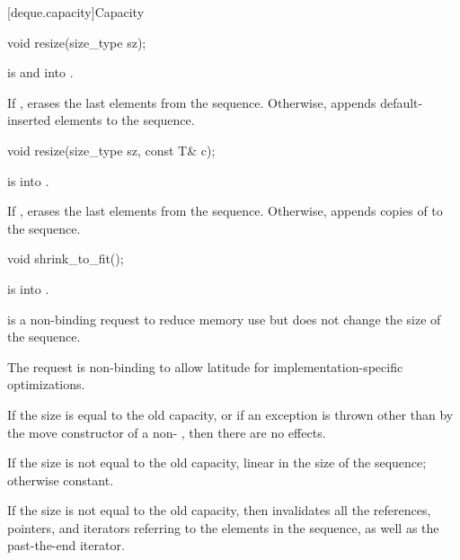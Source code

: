 [deque.capacity]{Capacity}

%
\begin{itemdecl}
void resize(size_type sz);
\end{itemdecl}

\begin{itemdescr}
\pnum
\expects
{} is  and  into .

\pnum
\effects
If , erases the last  elements
from the sequence. Otherwise,
appends  default-inserted elements to the sequence.
\end{itemdescr}

%
\begin{itemdecl}
void resize(size_type sz, const T& c);
\end{itemdecl}

\begin{itemdescr}
\pnum
\expects
{} is  into .

\pnum
\effects
If , erases the last  elements
from the sequence. Otherwise,
appends  copies of  to the sequence.
\end{itemdescr}

%
\begin{itemdecl}
void shrink_to_fit();
\end{itemdecl}

\begin{itemdescr}
\pnum
\expects
{} is  into .

\pnum
\effects
{} is a non-binding request to reduce memory use
but does not change the size of the sequence.
\begin{note}
The request is non-binding to allow latitude for
implementation-specific optimizations.
\end{note}
If the size is equal to the old capacity, or
if an exception is thrown other than by the move constructor
of a non- ,
then there are no effects.

\pnum
\complexity
If the size is not equal to the old capacity,
linear in the size of the sequence;
otherwise constant.

\pnum
\remarks
If the size is not equal to the old capacity,
then invalidates all the references, pointers, and iterators
referring to the elements in the sequence,
as well as the past-the-end iterator.
\end{itemdescr}

